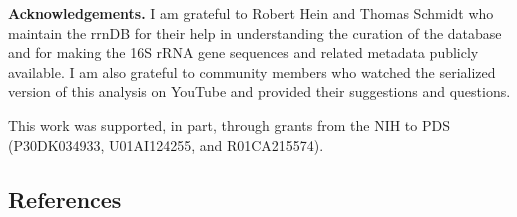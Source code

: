 \documentclass[
]{article}
\begin{document}
\textbf{Acknowledgements.} I am grateful to Robert Hein and Thomas
Schmidt who maintain the rrnDB for their help in understanding the
curation of the database and for making the 16S rRNA gene sequences and
related metadata publicly available. I am also grateful to community
members who watched the serialized version of this analysis on YouTube
and provided their suggestions and questions.

This work was supported, in part, through grants from the NIH to PDS
(P30DK034933, U01AI124255, and R01CA215574).

\newpage

\hypertarget{references}{%
\subsection{References}\label{references}}

\setlength{\parindent}{-0.25in}
\setlength{\leftskip}{0.25in}

\noindent
\end{document}
